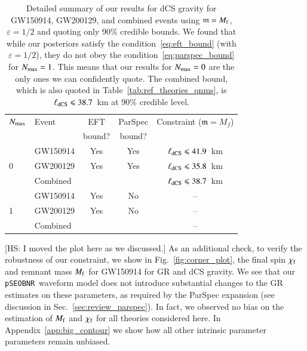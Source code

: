\documentclass[twocolumn,
               prd,
               aps,
               superscriptaddress,
               tightenlines,
               nofootinbib,
               eqsecnum,
               amsfonts,
               amsmath,
               longbibliography]{revtex4-1}
\newcommand{\Mf}{M_{\rm f}}
\newcommand{\pSEOB}{\texttt{pSEOBNR}}
\newcommand{\gm}{\mathfrak{m}}
\newcommand{\hscomm}[1]{{\textcolor{TealBlue}{{[HS: #1]}}}}
\begin{document}
\begin{table}[h]
\begin{tabular}{l l c c c}
\hline
\hline
$N_{\rm max}$ & Event & EFT    & ParSpec & Constraint ($\gm = M_{f}$) \\
              &       & bound? & bound?  &                            \\
\hline
      & GW150914 & Yes & Yes & $\ell_{\rm dCS} \leqslant 41.9$~km \\
0     & GW200129 & Yes & Yes & $\ell_{\rm dCS} \leqslant 35.8$~km \\
      & Combined &     &     & \cellcolor{black!10}$\ell_{\rm dCS} \leqslant 38.7$~km \\
\hline
      & GW150914 & Yes & No  & --                                 \\
1     & GW200129 & Yes & No  & --                                 \\
      & Combined &     &     & --                                 \\
\hline
\hline
\end{tabular}
\caption{Detailed summary of our results for dCS gravity for GW150914, GW200129, and
combined events using $\gm = M_{\rm f}$, $\varepsilon = 1/2$ and quoting only 90\% credible bounds.
%
We found that while our posteriors satisfy the condition~\eqref{eq:eft_bound} (with $\varepsilon = 1/2$),
they do not obey the condition~\eqref{eq:parspec_bound} for $N_{\rm max} = 1$. This means
that our results for $N_{\rm max}=0$ are the only ones we can confidently quote.
%
The combined bound, which is also quoted in Table~\ref{tab:ref_theories_qnms},
is $\ell_{\rm dCS} \leqslant 38.7$~km at 90\% credible level.
}
\label{tab:summary_dcs}
\end{table}

\hscomm{I moved the plot here as we discussed.}
%
As an additional check, to verify the robustness of our constraint, we show in
Fig.~\ref{fig:corner_plot}, the final spin $\chi_{\rm f}$ and remnant mass
$M_{\rm f}$ for GW150914 for GR and dCS gravity.
%
We see that our \pSEOB~waveform model does not introduce substantial changes
to the GR estimates on these parameters, as required by the ParSpec expansion
(see discussion in Sec.~\ref{sec:review_parspec}).
%
In fact, we observed no bias on the estimation of $\Mf$ and $\chi_{\rm f}$
for all theories considered here.
%
In Appendix~\ref{app:big_contour} we show how all other intrinsic parameter parameters
remain unbiased.
\end{document}
